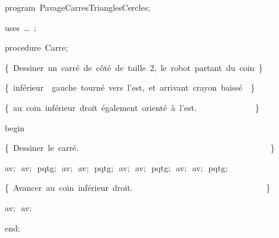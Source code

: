 
{
\parindent {}
\medskip

\carrenoir
\vspace{\neglskip}\mbox{\blc  \idt  \mcl program\idt \ PavageCarresTrianglesCercles$;$
}\par 
\vspace{\neglskip}\mbox{\blc \blk\idt \mcl uses\idt \ \ldots\ $;$
}\par 
\medskip

\pagebreak[3] 
\vspace{\neglskip}\mbox{\blc  \blk\idt  \mcl procedure\idt \ Carre$;$}\par 
\vspace{\neglskip}\mbox{\blc  \blk\blk\idt  \cmt  \{\ Dessiner\ un\ carr\'{e}\ de\ c\^{o}t\'{e}\ de\ taille\ 2,\ le\ robot\ partant\ du\ coin\ \}\idt }\par 
\vspace{\neglskip}\mbox{\blc  \blk\blk\idt  \cmt  \{\ inf\'{e}rieur\ \ gauche\ tourn\'{e}\ vers\ l{'}est,\ et\ arrivant\ crayon\ baiss\'{e}\ \ \}\idt }\par 
\vspace{\neglskip}\mbox{\blc  \blk\blk\idt  \cmt  \{\ au\ coin\ inf\'{e}rieur\ droit\ \'{e}galement\ orient\'{e}\ \`{a}\ l{'}est.\ \ \ \ \ \ \ \ \ \ \ \ \ \ \}\idt }\par 
\vspace{\neglskip}\mbox{\blc  \blk\idt  \mcl begin\idt }\par 
\vspace{\neglskip}\mbox{\blc  \blk\blk\idt  \cmt  \{\ Dessiner\ le\ carr\'{e}.\ \ \ \ \ \ \ \ \ \ \ \ \ \ \ \ \ \ \ \ \ \ \ \ \ \ \ \ \ \ \ \ \ \ \ \ \ \ \ \ \ \ \ \ \ \ \}\idt }\par 
\vspace{\neglskip}\mbox{\blc  \blk\blk\idt  av$;$\ av$;$\ pqtg$;$\ av$;$\ av$;$\ pqtg$;$\ av$;$\ av$;$\ pqtg$;$\ av$;$\ av$;$\ pqtg$;$}\par 
\vspace{\neglskip}\mbox{\blc  \blk\blk\idt  \cmt  \{\ Avancer\ au\ coin\ inf\'{e}rieur\ droit.\ \ \ \ \ \ \ \ \ \ \ \ \ \ \ \ \ \ \ \ \ \ \ \ \ \ \ \ \ \ \ \ \}\idt }\par 
\vspace{\neglskip}\mbox{\blc  \blk\blk\idt  av$;$\ av$;$\ }\par 
\vspace{\neglskip}\mbox{\blc  \blk\idt  \mcl end\idt $;$}\par 
\medskip

}
